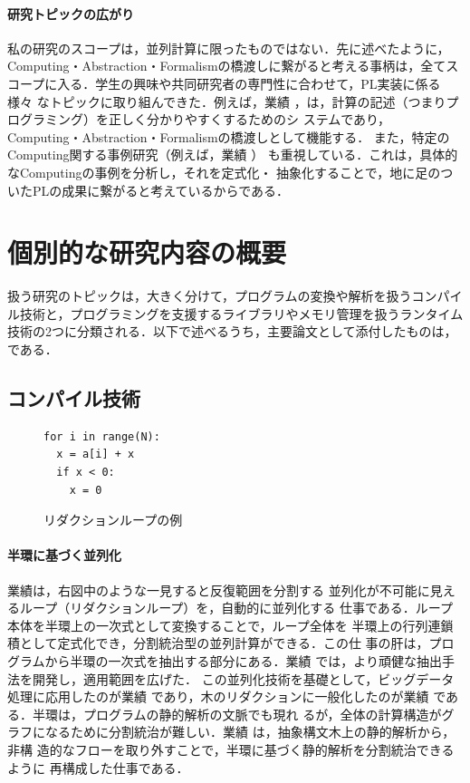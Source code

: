 \documentclass[dvipdfmx]{jsarticle}
\begin{document}
\paragraph{研究トピックの広がり}
私の研究のスコープは，並列計算に限ったものではない．先に述べたように，
Computing・Abstraction・Formalismの橋渡しに繋がると考える事柄は，全てス
コープに入る．学生の興味や共同研究者の専門性に合わせて，PL実装に係る様々
なトピックに取り組んできた．例えば，業績
\cite{gpce14:libdsl,aplas16:pyblame,ppl22:plags,pro22o:far_memory,jssst22:checkpoint,splash22:mvnb}
，は，計算の記述（つまりプログラミング）を正しく分かりやすくするためのシ
ステムであり，Computing・Abstraction・Formalismの橋渡しとして機能する．
また，特定のComputing関する事例研究（例えば，業績
\cite{icpp15:htm,ispass21:ib_odp,ppl22:sfa,ispass22:vipp,ppl23c3:otf_sfa}）
も重視している．これは，具体的なComputingの事例を分析し，それを定式化・
抽象化することで，地に足のついたPLの成果に繋がると考えているからである．


\section*{個別的な研究内容の概要}
扱う研究のトピックは，大きく分けて，プログラムの変換や解析を扱うコンパイ
ル技術と，プログラミングを支援するライブラリやメモリ管理を扱うランタイム
技術の2つに分類される．以下で述べるうち，主要論文として添付したものは，
\cite{pldi21:red_par,pldi11:red_par,aplas14:sd_dfa,ipdps21:plex,icpp15:htm}
である．

\subsection*{コンパイル技術}
\begin{figure}
 \centering
\begin{lstlisting}[basicstyle=\ttfamily,frame=tb]
for i in range(N):
  x = a[i] + x
  if x < 0:
    x = 0
\end{lstlisting}
\caption{リダクションループの例}\label{fig:reduction}
\end{figure}
\paragraph{半環に基づく並列化}
業績\cite{pldi11:red_par}は，右図中のような一見すると反復範囲を分割する
並列化が不可能に見えるループ（リダクションループ）を，自動的に並列化する
仕事である．ループ本体を半環上の一次式として変換することで，ループ全体を
半環上の行列連鎖積として定式化でき，分割統治型の並列計算ができる．この仕
事の肝は，プログラムから半環の一次式を抽出する部分にある．業績
\cite{pldi21:red_par}では，より頑健な抽出手法を開発し，適用範囲を広げた．
この並列化技術を基礎として，ビッグデータ処理に応用したのが業績
\cite{jip17:hadoop}であり，木のリダクションに一般化したのが業績
\cite{pro13:tree_par}である．半環は，プログラムの静的解析の文脈でも現れ
るが，全体の計算構造がグラフになるために分割統治が難しい．業績
\cite{jssst13:sd_dfa,aplas14:sd_dfa}は，抽象構文木上の静的解析から，非構
造的なフローを取り外すことで，半環に基づく静的解析を分割統治できるように
再構成した仕事である．
\end{document}
